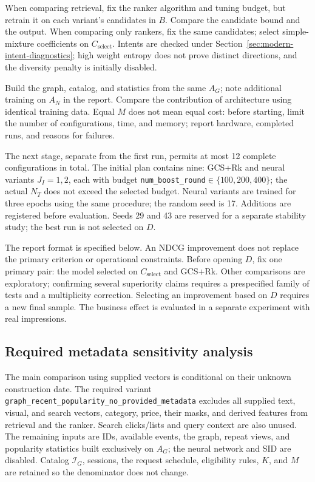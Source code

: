 \documentclass[12pt,a4paper]{article}
\newcommand{\code}[1]{{\ttfamily\small\nolinkurl{#1}}}
\theoremstyle{plainru}
\begin{document}
When comparing retrieval, fix the ranker algorithm and tuning budget,
but retrain it on each variant's candidates in $B$.
Compare the candidate bound and the output.
When comparing only rankers, fix
the same candidates; select simple-mixture coefficients on $C_{\mathrm{select}}$.
Intents are checked under Section~\ref{sec:modern-intent-diagnostics};
high weight entropy does not prove distinct directions,
and the diversity penalty is initially disabled.

Build the graph, catalog, and statistics from the same $A_G$; note additional
training on $A_N$ in the report. Compare the contribution of architecture
using identical training data. Equal $M$ does not mean equal
cost: before starting, limit the number of configurations, time, and memory;
report hardware, completed runs, and reasons for failures.

The next stage, separate from the first run, permits at most
12 complete configurations in total. The initial plan contains nine:
GCS+Rk and neural variants $J_I=1,2$, each with budget
\code{num_boost_round}$\in\{100,200,400\}$; the actual $N_T$
does not exceed the selected budget.
Neural variants are trained for three epochs using the same procedure;
the random seed is 17. Additions are registered before evaluation.
Seeds 29 and 43 are reserved for a separate
stability study; the best run is not selected on $D$.

The report format is specified below. An NDCG improvement does not replace the primary criterion
or operational constraints. Before opening $D$, fix one
primary pair: the model selected on $C_{\mathrm{select}}$ and GCS+Rk. Other comparisons
are exploratory; confirming several superiority claims requires
a prespecified family of tests and a multiplicity correction.
Selecting an improvement based on $D$ requires a new final sample.
The business effect is evaluated in a separate experiment with real impressions.

\subsection{Required metadata sensitivity analysis}
\label{sec:metadata-sensitivity}

The main comparison using supplied vectors is conditional on
their unknown construction date. The required variant
\code{graph_recent_popularity_no_provided_metadata} excludes all
supplied text, visual, and search vectors, category,
price, their masks, and derived features from retrieval and the ranker.
Search clicks/lists and query context are also unused.
The remaining inputs are IDs, available events, the graph, repeat views, and popularity
statistics built exclusively on $A_G$; the neural network and SID
are disabled. Catalog $\mathcal I_G$, sessions, the request schedule,
eligibility rules, $K$, and $M$ are retained so the denominator does not change.
\end{document}

